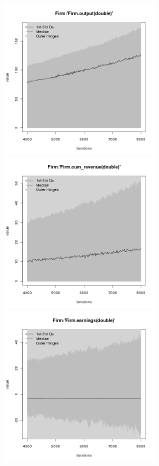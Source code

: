 \begin{figure}[H!]
\centering\leavevmode
\begin{minipage}{17cm}
\centering\leavevmode
\includegraphics[width=8cm]{./png/tax_0.05/Firm-output.png}
\includegraphics[width=8cm]{./png/tax_0.05/Firm-cum_revenue.png}\\
\includegraphics[width=8cm]{./png/tax_0.05/Firm-earnings.png}

\end{minipage}
\end{figure}
